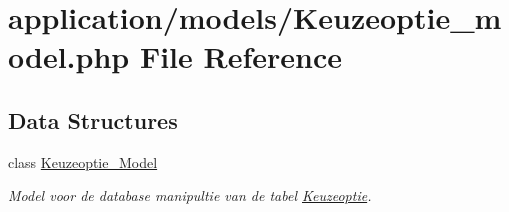 \hypertarget{_keuzeoptie__model_8php}{}\section{application/models/\+Keuzeoptie\+\_\+model.php File Reference}
\label{_keuzeoptie__model_8php}
\subsection*{Data Structures}
\begin{DoxyCompactItemize}
\item 
class \mbox{\hyperlink{class_keuzeoptie___model}{Keuzeoptie\+\_\+\+Model}}
\begin{DoxyCompactList}\small\item\em Model voor de database manipultie van de tabel \mbox{\hyperlink{class_keuzeoptie}{Keuzeoptie}}. \end{DoxyCompactList}\end{DoxyCompactItemize}
